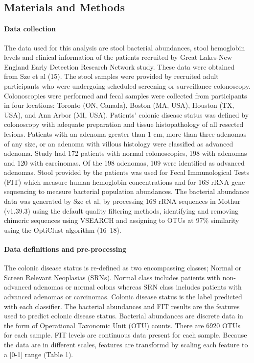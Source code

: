 \documentclass[11pt,]{article}
\let\oldparagraph\paragraph
\renewcommand{\paragraph}[1]{\oldparagraph{#1}\mbox{}}
\begin{document}
\subsection{Materials and Methods}\label{materials-and-methods}

\paragraph{Data collection}\label{data-collection}

The data used for this analysis are stool bacterial abundances, stool
hemoglobin levels and clinical information of the patients recruited by
Great Lakes-New England Early Detection Research Network study. These
data were obtained from Sze et al (15). The stool samples were provided
by recruited adult participants who were undergoing scheduled screening
or surveillance colonoscopy. Colonoscopies were performed and fecal
samples were collected from participants in four locations: Toronto (ON,
Canada), Boston (MA, USA), Houston (TX, USA), and Ann Arbor (MI, USA).
Patients' colonic disease status was defined by colonoscopy with
adequate preparation and tissue histopathology of all resected lesions.
Patients with an adenoma greater than 1 cm, more than three adenomas of
any size, or an adenoma with villous histology were classified as
advanced adenoma. Study had 172 patients with normal colonoscopies, 198
with adenomas and 120 with carcinomas. Of the 198 adenomas, 109 were
identified as advanced adenomas. Stool provided by the patients was used
for Fecal Immunological Tests (FIT) which measure human hemoglobin
concentrations and for 16S rRNA gene sequencing to measure bacterial
population abundances. The bacterial abundance data was generated by Sze
et al, by processing 16S rRNA sequences in Mothur (v1.39.3) using the
default quality filtering methods, identifying and removing chimeric
sequences using VSEARCH and assigning to OTUs at 97\% similarity using
the OptiClust algorithm (16--18).

\paragraph{Data definitions and
pre-processing}\label{data-definitions-and-pre-processing}

The colonic disease status is re-defined as two encompassing classes;
Normal or Screen Relevant Neoplasias (SRNs). Normal class includes
patients with non-advanced adenomas or normal colons whereas SRN class
includes patients with advanced adenomas or carcinomas. Colonic disease
status is the label predicted with each classifier. The bacterial
abundances and FIT results are the features used to predict colonic
disease status. Bacterial abundances are discrete data in the form of
Operational Taxonomic Unit (OTU) counts. There are 6920 OTUs for each
sample. FIT levels are continuous data present for each sample. Because
the data are in different scales, features are transformd by scaling
each feature to a {[}0-1{]} range (Table 1).
\end{document}
